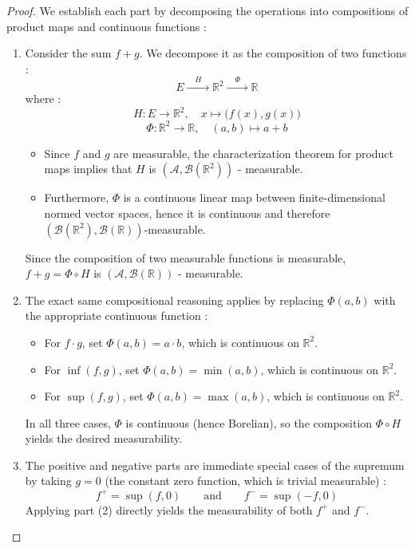 \begin{proof}
We establish each part by decomposing the operations into compositions of product maps and continuous functions :

\begin{enumerate}
    \item
    Consider the sum $f + g$. We decompose it as the composition of two functions :
    \[
        E \xrightarrow{\quad H \quad} \mathbb{R}^2 \xrightarrow{\quad \Phi \quad} \mathbb{R}
    \]
    where :
    \[
        H : E \to \mathbb{R}^2, \quad x \mapsto \big(f(x), g(x)\big)
    \]
    \[
        \Phi : \mathbb{R}^2 \to \mathbb{R}, \quad (a, b) \mapsto a + b
    \]
    \begin{itemize}
        \item Since $f$ and $g$ are measurable, the characterization theorem for product maps implies that $H$ is $(\mathcal{A}, \mathcal{B}(\mathbb{R}^2))$ - measurable.
        \item Furthermore, $\Phi$ is a continuous linear map between finite-dimensional normed vector spaces, hence it is continuous and therefore $(\mathcal{B}(\mathbb{R}^2), \mathcal{B}(\mathbb{R}))$-measurable.
    \end{itemize}
    Since the composition of two measurable functions is measurable, $f + g = \Phi \circ H$ is $(\mathcal{A}, \mathcal{B}(\mathbb{R}))$ - measurable.

    \vspace{1em}
    \item
    The exact same compositional reasoning applies by replacing $\Phi(a, b)$ with the appropriate continuous function :
    \begin{itemize}
        \item For $f \cdot g$, set $\Phi(a, b) = a \cdot b$, which is continuous on $\mathbb{R}^2$.
        \item For $\inf(f, g)$, set $\Phi(a, b) = \min(a, b)$, which is continuous on $\mathbb{R}^2$.
        \item For $\sup(f, g)$, set $\Phi(a, b) = \max(a, b)$, which is continuous on $\mathbb{R}^2$.
    \end{itemize}
    In all three cases, $\Phi$ is continuous (hence Borelian), so the composition $\Phi \circ H$ yields the desired measurability.

    \vspace{1em}
    \item
    The positive and negative parts are immediate special cases of the supremum by taking $g = 0$ (the constant zero function, which is trivial measurable) :
    \[
        f^+ = \sup(f, 0) \qquad \text{and} \qquad f^- = \sup(-f, 0)
    \]
    Applying part (2) directly yields the measurability of both $f^+$ and $f^-$.
\end{enumerate}
\end{proof}

